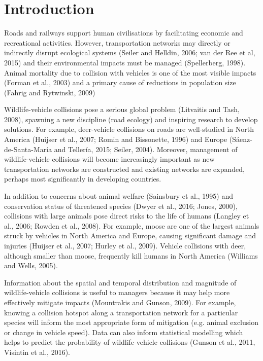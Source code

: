\newpage
\section{Introduction}

Roads and railways support human civilisations by facilitating economic and recreational activities. However, transportation networks may directly or indirectly disrupt ecological systems (Seiler and Helldin, 2006; van der Ree et al, 2015) and their environmental impacts must be managed (Spellerberg, 1998). Animal mortality due to collision with vehicles is one of the most visible impacts (Forman et al., 2003) and a primary cause of reductions in population size (Fahrig and Rytwinski, 2009)
 
Wildlife-vehicle collisions pose a serious global problem (Litvaitis and Tash, 2008), spawning a new discipline (road ecology) and inspiring research to develop solutions. For example, deer-vehicle collisions on roads are well-studied in North America (Huijser et al., 2007; Romin and Bissonette, 1996) and Europe (Sáenz-de-Santa-María and Tellería, 2015; Seiler, 2004). Moreover, management of wildlife-vehicle collisions will become increasingly important as new transportation networks are constructed and existing networks are expanded, perhaps most significantly in developing countries.

In addition to concerns about animal welfare (Sainsbury et al., 1995) and conservation status of threatened species (Dwyer et al., 2016; Jones, 2000), collisions with large animals pose direct risks to the life of humans (Langley et al., 2006; Rowden et al., 2008).  For example, moose are one of the largest animals struck by vehicles in North America and Europe, causing significant damage and injuries (Huijser et al., 2007; Hurley et al., 2009).  Vehicle collisions with deer, although smaller than moose, frequently kill humans in North America (Williams and Wells, 2005).

Information about the spatial and temporal distribution and magnitude of wildlife-vehicle collisions is useful to managers because it may help more effectively mitigate impacts (Mountrakis and Gunson, 2009). For example, knowing a collision hotspot along a transportation network for a particular species will inform the most appropriate form of mitigation (e.g. animal exclusion or change in vehicle speed). Data can also inform statistical modelling which helps to predict the probability of wildlife-vehicle collisions (Gunson et al., 2011, Visintin et al., 2016).

